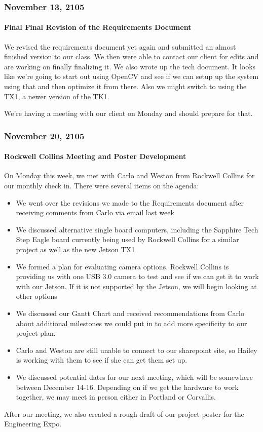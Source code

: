 \subsubsection{November 13, 2105}
\paragraph{Final Final Revision of the Requirements Document}
We revised the requirements document yet again and submitted an almost finished version to our class. We then were able to contact our client for edits and are working on finally finalizing it. We also wrote up the tech document. It looks like we're going to start out using OpenCV and see if we can setup up the system using that and then optimize it from there. Also we might switch to using the TX1, a newer version of the TK1.
\par
We're having a meeting with our client on Monday and should prepare for that.\\

\subsubsection{November 20, 2105}
\paragraph{Rockwell Collins Meeting and Poster Development}
On Monday this week, we met with Carlo and Weston from Rockwell Collins for our monthly check in. There were several items on the agenda:

\begin{itemize}[leftmargin=2cm,labelindent=2cm]
\item We went over the revisions we made to the Requirements document after receiving comments from Carlo via email last week
\item We discussed alternative single board computers, including the Sapphire Tech Step Eagle board currently being used by Rockwell Collins for a similar project as well as the new Jetson TX1
\item We formed a plan for evaluating camera options. Rockwell Collins is providing us with one USB 3.0 camera to test and see if we can get it to work with our Jetson. If it is not supported by the Jetson, we will begin looking at other options
\item We discussed our Gantt Chart and received recommendations from Carlo about additional milestones we could put in to add more specificity to our project plan. 
\item Carlo and Weston are still unable to connect to our sharepoint site, so Hailey is working with them to see if she can get them set up.
\item We discussed potential dates for our next meeting, which will be somewhere between December 14-16.  Depending on if we get the hardware to work together, we may meet in person either in Portland or Corvallis.
\end{itemize}
After our meeting, we also created a rough draft of our project poster for the Engineering Expo.\\

